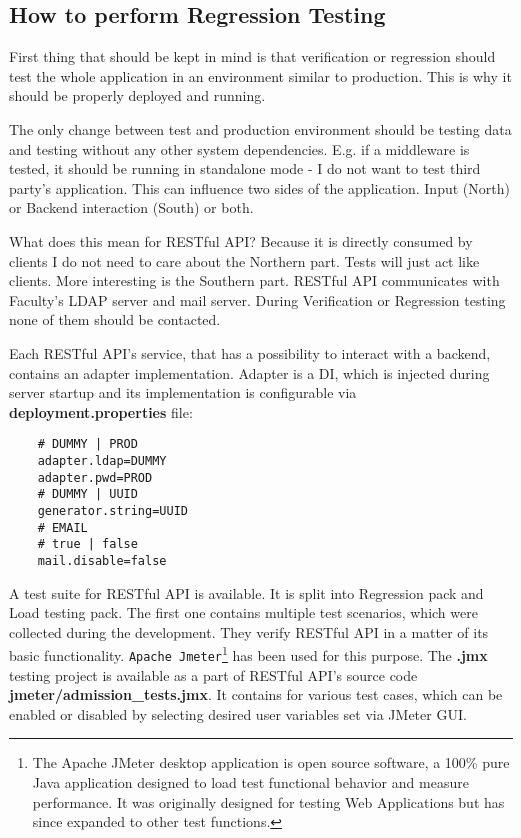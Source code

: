 	\subsection{How to perform Regression Testing}
	
	First thing that should be kept in mind is that verification or regression should test the whole application in an
	environment similar to production. This is why it should be properly deployed and running.
	
	The only change between test and production environment should be testing data and testing without any other system
	dependencies. E.g. if a middleware is tested, it should be running in standalone mode - I do not want to test third
	party's application. This can influence two sides of the application. Input (North) or Backend interaction (South) or
	both.
	
	What does this mean for RESTful API? Because it is directly consumed by clients I do not need to care about the
	Northern part. Tests will just act like clients. More interesting is the Southern part. RESTful API communicates with
	Faculty's LDAP server and mail server. During Verification or Regression testing none of them should be contacted.
	
	Each RESTful API's service, that has a possibility to interact with a backend, contains an adapter implementation.
	Adapter is a \gls{DI}, which is injected during server startup and its implementation is configurable via
	\textbf{deployment.properties} file:
	
	\begin{verbatim}
	# DUMMY | PROD
	adapter.ldap=DUMMY
	adapter.pwd=PROD
	# DUMMY | UUID
	generator.string=UUID
	# EMAIL
	# true | false
	mail.disable=false
	\end{verbatim}
	
	A test suite for RESTful API is available. It is split into Regression pack and Load testing pack. The first one
	contains multiple test scenarios, which were collected during the development. They verify RESTful API in a matter of
	its basic functionality. \verb|Apache Jmeter|\footnote{\cite{jmeter} The Apache JMeter\textsuperscript{\texttrademark}
	desktop application is open source software, a 100\% pure Java application designed to load test functional behavior and measure performance. It was originally designed for testing Web Applications but has since expanded to other test functions.} has been used for
	this purpose. The \textbf{.jmx} testing project is available as a part of RESTful API's source code
	\textbf{jmeter/admission\_tests.jmx}. It contains  for various test cases, which can be enabled or
	disabled by selecting desired user variables set via JMeter GUI.
	
